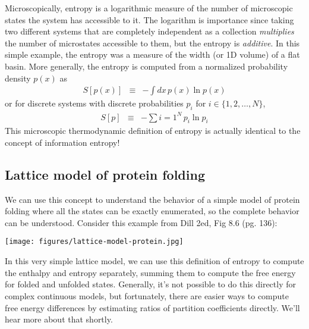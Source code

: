 \documentclass[english,course]{lecture}
\begin{document}
Microscopically, entropy is a logarithmic measure of the number of microscopic states the system has accessible to it. 
The logarithm is importance since taking two different systems that are completely independent as a collection \emph{multiplies} the number of microstates accessible to them, but the entropy is \emph{additive}.
In this simple example, the entropy was a measure of the width (or 1D volume) of a flat basin.
More generally, the entropy is computed from a normalized probability density $p(x)$ as
\begin{eqnarray}
S[p(x)] &\equiv& - \int dx \, p(x) \ln p(x)
\end{eqnarray}
or for discrete systems with discrete probabilities $p_i$ for $i \in \{1, 2, \ldots, N \}$,
\begin{eqnarray}
S[p] &\equiv& - \sum{i=1}^N \, p_i \ln p_i
\end{eqnarray}
This microscopic thermodynamic definition of entropy is actually identical to the concept of information entropy!

\subsection{Lattice model of protein folding}

We can use this concept to understand the behavior of a simple model of protein folding where all the states can be exactly enumerated, so the complete behavior can be understood.
Consider this example from Dill 2ed, Fig 8.6 (pg. 136):

\begin{centering}
\texttt{[image: figures/lattice-model-protein.jpg]}

\end{centering}

In this very simple lattice model, we can use this definition of entropy to compute the enthalpy and entropy separately, summing them to compute the free energy for folded and unfolded states.
Generally, it's not possible to do this directly for complex continuous models, but fortunately, there are easier ways to compute free energy differences by estimating ratios of partition coefficients directly.
We'll hear more about that shortly.

\end{document}
